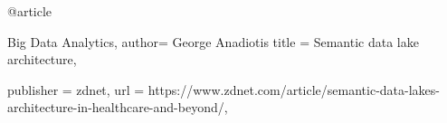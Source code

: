 @article {Big Data Analytics,
author={ George Anadiotis}
title = {Semantic data lake architecture},

publisher = {zdnet},
url = {https://www.zdnet.com/article/semantic-data-lakes-architecture-in-healthcare-and-beyond/},
}
